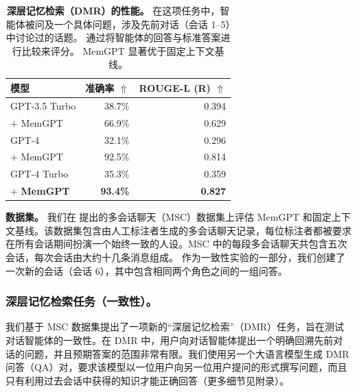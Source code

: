 \documentclass[UTF8,fontset=fandol,a4paper,11pt]{ctexart}
\newcommand{\ours}{MemGPT\xspace}
\begin{document}




\begin{table}[t!]
\caption{
\textbf{深层记忆检索（DMR）的性能。}
在这项任务中，智能体被问及一个具体问题，涉及先前对话（会话 1--5）中讨论过的话题。
通过将智能体的回答与标准答案进行比较来评分。
\ours 显著优于固定上下文基线。
}
\label{table:deep-memory-task}

\begin{center}
\begin{tabular}{lrr}
\toprule
\bf 模型 & \textbf{准确率} $\Uparrow$ & \bf ROUGE-L (R) $\Uparrow$ \\
\midrule

GPT-3.5 Turbo & 38.7\% & 0.394  \\
$+$ MemGPT & 66.9\% & 0.629 \\


GPT-4 & 32.1\% & 0.296 \\

$+$ MemGPT & 92.5\% & 0.814  \\


GPT-4 Turbo & 35.3\% & 0.359  \\

$+$ \textbf{MemGPT} & \textbf{93.4\%} & \textbf{0.827}  \\

\bottomrule
\end{tabular}
\end{center}

\end{table}



\textbf{数据集。}
我们在 \citet{xu2021mscbeyond} 提出的多会话聊天（MSC）数据集上评估 \ours 和固定上下文基线。该数据集包含由人工标注者生成的多会话聊天记录，每位标注者都被要求在所有会话期间扮演一个始终一致的人设。MSC 中的每段多会话聊天共包含五次会话，每次会话由大约十几条消息组成。
作为一致性实验的一部分，我们创建了一次新的会话（会话 6），其中包含相同两个角色之间的一组问答。



\subsubsection{深层记忆检索任务（一致性）。}
我们基于 MSC 数据集提出了一项新的“深层记忆检索”（DMR）任务，旨在测试对话智能体的一致性。在 DMR 中，用户向对话智能体提出一个明确回溯先前对话的问题，并且预期答案的范围非常有限。我们使用另一个大语言模型生成 DMR 问答（QA）对，要求该模型以一位用户向另一位用户提问的形式撰写问题，而且只有利用过去会话中获得的知识才能正确回答（更多细节见附录）。
\end{document}
